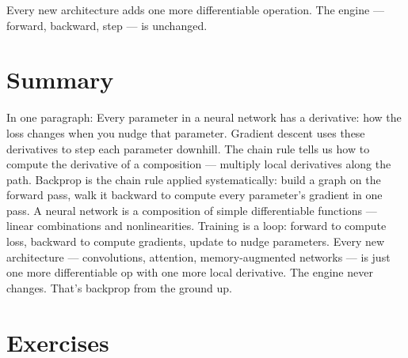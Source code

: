 \documentclass[11pt,a4paper]{book}
\begin{document}
Every new architecture adds one more differentiable operation. The engine --- forward, backward, step --- is unchanged.

\clearpage

\chapter*{Summary}

In one paragraph: Every parameter in a neural network has a derivative: how the loss changes when you nudge that parameter. Gradient descent uses these derivatives to step each parameter downhill. The chain rule tells us how to compute the derivative of a composition --- multiply local derivatives along the path. Backprop is the chain rule applied systematically: build a graph on the forward pass, walk it backward to compute every parameter's gradient in one pass. A neural network is a composition of simple differentiable functions --- linear combinations and nonlinearities. Training is a loop: forward to compute loss, backward to compute gradients, update to nudge parameters. Every new architecture --- convolutions, attention, memory-augmented networks --- is just one more differentiable op with one more local derivative. The engine never changes. That's backprop from the ground up.

\chapter*{Exercises}
\end{document}
